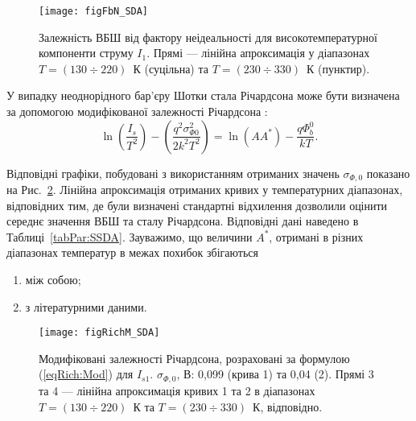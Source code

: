 \begin{figure}
\center
\texttt{[image: figFbN\_SDA]}
\caption{\label{figFbN_SDA}
Залежність ВБШ від фактору неідеальності для високотемпературної компоненти струму $I_1$.
Прямі --- лінійна апроксимація у діапазонах $T=(130\div220)$~К (суцільна) та $T=(230\div330)$~К (пунктир).
}%
\end{figure}

У випадку неоднорідного бар'єру Шотки стала Річардсона може бути визначена за
допомогою модифікованої залежності Річардсона \cite{Tascioglu2010old,Yildirim2010}:
\begin{equation} \label{eqRich:Mod}
\ln\left(\frac{I_s}{T^2}\right)-\left(\frac{q^2\sigma_{\Phi0}^2}{2k^2T^2}\right)=\ln(AA^*)-\frac{q\Phi_b^0}{kT}.
\end{equation}

Відповідні графіки, побудовані з використанням отриманих значень $\sigma_{\Phi,0}$ показано на Рис.~\ref{figRichM_SDA}.
Лінійна апроксимація отриманих кривих у температурних діапазонах, відповідних тим, де були визначені стандартні відхилення
дозволили оцінити середнє значення ВБШ та сталу Річардсона.
Відповідні дані наведено в Таблиці~\ref{tabPar:SSDA}.
Зауважимо, що величини $A^*$, отримані в різних діапазонах температур в межах похибок збігаються
\begin{enumerate}[label=\asbuk*),leftmargin=0em,itemindent=1.5em]
\item між собою;
\item з літературними даними.
\end{enumerate}


\begin{figure}
\center
\texttt{[image: figRichM\_SDA]}
\caption{\label{figRichM_SDA}
Модифіковані залежності Річардсона, розраховані за формулою (\ref{eqRich:Mod}) для $I_{s1}$.
$\sigma_{\Phi,0}$, В: 0,099 (крива 1) та 0,04 (2).
Прямі 3 та 4 --- лінійна апроксимація кривих 1 та 2 в діапазонах $T=(130\div220)$~К
та $T=(230\div330)$~К, відповідно.
}%
\end{figure}

